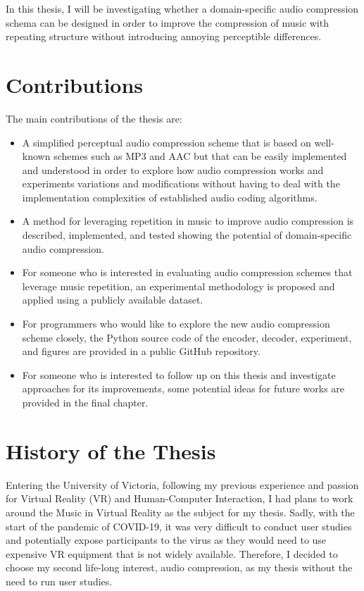 In this thesis, I will be investigating whether a domain-specific audio compression schema can be designed in order to improve the compression of music with repeating structure without introducing annoying perceptible differences.


\section{Contributions}

The main contributions of the thesis are: 


\begin{itemize}
\item A simplified perceptual audio compression scheme that is based on well-known schemes such as MP3 and AAC but that can be easily implemented and understood in order to explore how audio compression works and experiments variations and modifications without having to deal with the implementation complexities 
of established audio coding algorithms. 

\item A method for leveraging repetition in music to improve audio compression is described, implemented, and tested showing the potential of domain-specific audio compression. 

\item For someone who is interested in evaluating audio compression schemes that leverage music repetition, an experimental methodology is proposed and applied using a 
publicly available dataset. 

\item For programmers who would like to explore the new audio compression scheme closely, the Python source code of the encoder, decoder, experiment, and figures are provided in a public GitHub repository\cite{github2022thesis}.

\item For someone who is interested to follow up on this thesis and investigate approaches for its improvements, some potential ideas for future works are provided in the final chapter.
\end{itemize}

\section{History of the Thesis}

Entering the University of Victoria, following my previous experience and passion for Virtual Reality (VR) and Human-Computer Interaction, I had plans to work around the Music in Virtual Reality as the subject for my thesis. Sadly, with the start of the pandemic of COVID-19, it was very difficult to conduct user studies and potentially expose participants to the virus 
as they would need to use expensive VR equipment that is not widely available. Therefore, I decided to choose my second life-long interest, audio compression, as my thesis without the need to run user studies.

